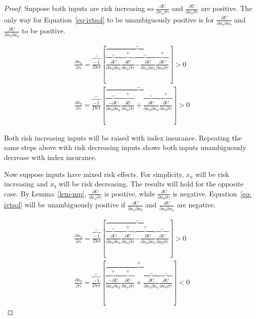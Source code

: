 \documentclass[
  letterpaper,
  DIV=11,
  numbers=noendperiod]{scrartcl}
\theoremstyle{plain}
\theoremstyle{plain}
\theoremstyle{remark}
\begin{document}
\begin{proof}
Suppose both inputs are risk increasing so
\(\frac{\partial U}{\partial x_a\partial \gamma}\) and
\(\frac{\partial U}{\partial x_b\partial \gamma}\) are positive. The
only way for Equation~\ref{eq-ivtsol} to be unambiguously positive is
for \(\frac{\partial U}{\partial x_a\partial x_b}\) and
\(\frac{\partial U}{\partial x_b\partial x_a}\) to be positive.

\[
\begin{aligned}
&\frac{\partial x_a}{\partial \gamma}=\overbrace{\frac{-1}{Det}}^{-}\left[\overbrace{\overbrace{\frac{\partial U}{\partial x_b \partial x_b}}^{-}\overbrace{\frac{\partial U}{\partial x_a \partial \gamma}}^{+}\overbrace{-\frac{\partial U}{\partial x_a \partial x_b}}^{-}\overbrace{\frac{\partial U}{\partial x_b \partial \gamma}}^{+}}^{-}\right] >0\\
&\frac{\partial x_b}{\partial \gamma}=\overbrace{\frac{-1}{Det}}^{-}\left[\overbrace{\overbrace{\frac{-\partial U}{\partial x_b \partial x_a}}^{-}\overbrace{\frac{\partial U}{\partial x_a \partial \gamma}}^{+}+\overbrace{\frac{\partial U}{\partial x_a \partial x_a}}^{-}\overbrace{\frac{\partial U}{\partial x_b \partial \gamma}}^{+}}^{-}\right]>0
\end{aligned}
\]

Both risk increasing inputs will be raised with index insurance.
Repeating the same steps above with risk decreasing inputs shows both
inputs unambiguously decrease with index insurance.

Now suppose inputs have mixed risk effects. For simplicity, \(x_a\) will
be risk increasing and \(x_b\) will be risk decreasing. The results will
hold for the opposite case. By Lemma~\ref{lem-mp},
\(\frac{\partial U}{\partial x_a\partial \gamma}\) is positive, while
\(\frac{\partial U}{\partial x_b\partial \gamma}\) is negative.
Equation~\ref{eq-ivtsol} will be unambiguously positive if
\(\frac{\partial U}{\partial x_a\partial x_b}\) and
\(\frac{\partial U}{\partial x_b\partial x_a}\) are negative.

\[
\begin{aligned}
&\frac{\partial x_a}{\partial \gamma}=\overbrace{\frac{-1}{Det}}^{-}\left[\overbrace{\overbrace{\frac{\partial U}{\partial x_b\partial x_b}}^{-}\overbrace{\frac{\partial U}{\partial x_a \partial \gamma}}^{+}\overbrace{-\frac{\partial U}{\partial x_a \partial x_b}}^{+}\overbrace{\frac{\partial U}{\partial x_b\partial \gamma}}^{-}}^{-}\right] >0\\
&\frac{\partial x_b}{\partial \gamma}=\overbrace{\frac{-1}{Det}}^{-}\left[\overbrace{\overbrace{\frac{-\partial U}{\partial x_b\partial x_a}}^{+}\overbrace{\frac{\partial U}{\partial x_a \partial \gamma}}^{+}+\overbrace{\frac{\partial U}{\partial x_a \partial x_a}}^{-}\overbrace{\frac{\partial U}{\partial x_b\partial \gamma}}^{-}}^{+}\right]<0
\end{aligned}
\]


\end{proof}
\end{document}
